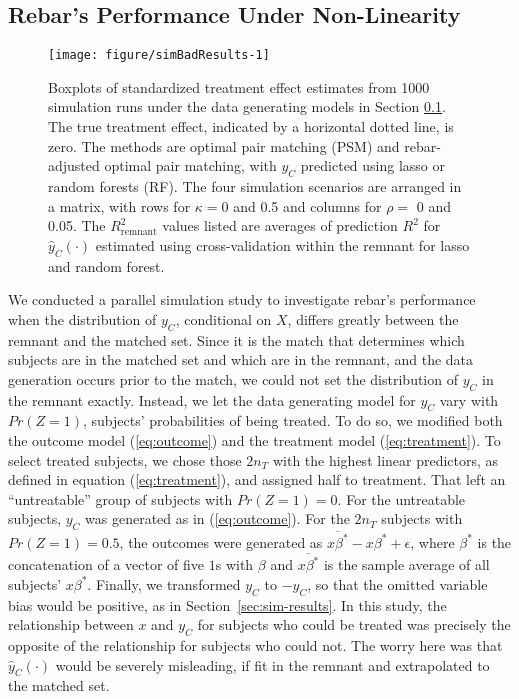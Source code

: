 \documentclass[12pt]{article}\usepackage[]{graphicx}\usepackage[]{color}
\makeatletter
\def\maxwidth{ %
  \ifdim\Gin@nat@width>\linewidth
    \linewidth
  \else
    \Gin@nat@width
  \fi
}
\newenvironment{knitrout}{}{} %
\newcommand{\algorithm}{\hat{y}_C(\cdot)}
\newcommand{\covVec}{x}
\makeatother
\begin{document}
\subsection{Rebar's Performance Under Non-Linearity}\label{sec:sim-non-linear}
\begin{figure}
\centering
\begin{knitrout}
\color{fgcolor}
\texttt{[image: figure/simBadResults-1]} 

\end{knitrout}

\caption{Boxplots of standardized treatment effect estimates from 1000
  simulation runs under the data generating models in Section \ref{sec:sim-non-linear}. The true treatment effect, indicated by a
  horizontal dotted line, is zero. The methods are optimal pair
  matching (PSM) and rebar-adjusted optimal pair matching, with
  $y_C$ predicted using lasso or random forests (RF). The four simulation
  scenarios are arranged in a matrix, with rows for
  $\kappa=$0 and 0.5 %
and columns for $\rho=$ 0 and 0.05. %
The $R^2_{\text{remnant}}$ values listed are averages of
  prediction $R^2$ for $\algorithm$ estimated using
  cross-validation within the remnant for lasso and random forest.}
\label{fig:sim-bad}
\end{figure}

We conducted a parallel simulation study to investigate rebar's performance when the
distribution of $y_C$, conditional on $X$, differs greatly between the
remnant and the matched set.
Since it is the match that determines which subjects are in the
matched set and which are in the remnant, and the data generation
occurs prior to the match, we could not set the distribution of
$y_C$ in the remnant exactly.
Instead, we let the data generating model for $y_C$ vary with
$Pr(Z=1)$, subjects' probabilities of being treated.
To do so, we modified both the outcome model (\ref{eq:outcome}) and
the treatment model (\ref{eq:treatment}).
To select treated subjects, we chose those $2n_T$ with the highest
linear predictors, as defined in equation (\ref{eq:treatment}), and assigned
half to treatment.
That left an ``untreatable'' group of subjects with $Pr(Z=1)=0$.
For the untreatable subjects, $y_C$ was generated as in
(\ref{eq:outcome}).
For the $2n_T$ subjects with $Pr(Z=1)=0.5$, the outcomes were
generated as $\overline{\covVec\beta^*}-\covVec\beta^*+\epsilon$,
where $\beta^*$ is the concatenation of a vector of five $1$s with
$\beta$ and $\overline{\covVec\beta^*}$ is the sample average of
  all subjects' $\covVec\beta^*$.
Finally, we transformed $y_C$ to $-y_C$, so that the omitted variable
bias would be positive, as in Section~\ref{sec:sim-results}.
In this study, the relationship between $\covVec$ and $y_C$ for
subjects who could be treated was precisely the opposite of the
relationship for subjects who could not.
The worry here was that $\algorithm$ would be severely
misleading, if fit in the remnant and extrapolated to the matched set.
\end{document}
